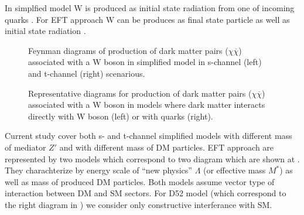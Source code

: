 





In simplfied model W is produced as initial state radiation from one of incoming quarks . 
For EFT approach W can be produces as final state particle  as well as initial state radiation .

\begin{figure}[hb]
  \quad
  \caption{Feynman diagrams of production of dark matter pairs ($\chi\overline{\chi}$) associated with a W boson in simplified model 
	   in s-channel (left) and t-channel (right) scenarious.}
  \label{fig:feynMonoWSimple}
\end{figure}

\begin{figure}[hb]
  \quad
  \caption{Representative diagrams for production of dark matter pairs ($\chi\overline{\chi}$) associated with a W boson in models where
dark matter interacts directly with W boson (left) or with quarks (right).}
  \label{fig:feynMonoWEFT}
\end{figure}

Current study cover both s- and t-channel simplified models with different mass of mediator $Z'$ and with different mass of DM particles.
EFT approach are represented by two models which correspond to two diagram which are shown at . 
They charachterize by energy scale of ``new physics'' $\Lambda$ (or effective mass $M^{*}$) as well as mass of produced DM particles.
Both models assume vector type of interaction between DM and SM sectors. For D52 model (which correspond to the right diagram in  ) 
we consider only constructive interferance with SM.

